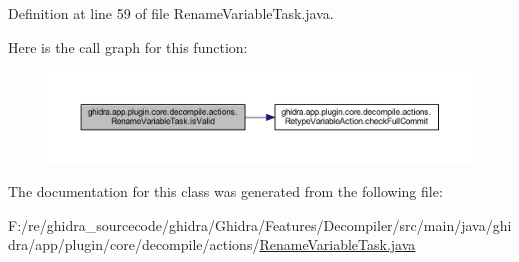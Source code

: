Definition at line 59 of file Rename\+Variable\+Task.\+java.

Here is the call graph for this function\+:
\nopagebreak
\begin{figure}[H]
\begin{center}
\leavevmode
\includegraphics[width=350pt]{classghidra_1_1app_1_1plugin_1_1core_1_1decompile_1_1actions_1_1_rename_variable_task_acc7ac5e6f22793df98ecabcd2a60f59c_cgraph}
\end{center}
\end{figure}


The documentation for this class was generated from the following file\+:\begin{DoxyCompactItemize}
\item 
F\+:/re/ghidra\+\_\+sourcecode/ghidra/\+Ghidra/\+Features/\+Decompiler/src/main/java/ghidra/app/plugin/core/decompile/actions/\mbox{\hyperlink{_rename_variable_task_8java}{Rename\+Variable\+Task.\+java}}\end{DoxyCompactItemize}
